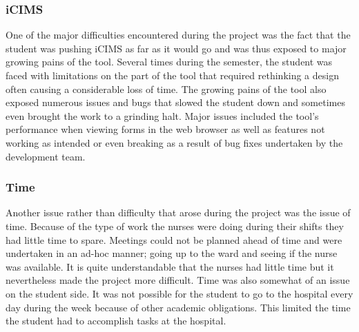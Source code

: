 \subsubsection{iCIMS}
One of the major difficulties encountered during the project was the fact that the student was pushing iCIMS as far as it would go and was thus exposed to major growing pains of the tool. Several times during the semester, the student was faced with limitations on the part of the tool that required rethinking a design often causing a considerable loss of time. The growing pains of the tool also exposed numerous issues and bugs that slowed the student down and sometimes even brought the work to a grinding halt. Major issues included the tool's performance when viewing forms in the web browser as well as features not working as intended or even breaking as a result of bug fixes undertaken by the development team.  

\subsubsection{Time}
Another issue rather than difficulty that arose during the project was the issue of time. Because of the type of work the nurses were doing during their shifts they had little time to spare. Meetings could not be planned ahead of time and were undertaken in an ad-hoc manner; going up to the ward and seeing if the nurse was available. It is quite understandable that the nurses had little time but it nevertheless made the project more difficult. Time was also somewhat of an issue on the student side. It was not possible for the student to go to the hospital every day during the week because of other academic obligations. This limited the time the student had to accomplish tasks at the hospital.

